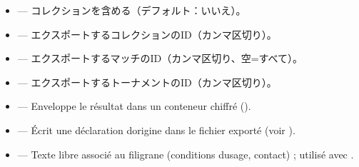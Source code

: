 \documentclass[letterpaper,10pt,dvipdfmx]{sphinxmanual}
\begin{document}
\begin{itemize}
\item {} 
\sphinxAtStartPar
{} — コレクションを含める（デフォルト：いいえ）。

\item {} 
\sphinxAtStartPar
{} — エクスポートするコレクションのID（カンマ区切り）。

\item {} 
\sphinxAtStartPar
{} — エクスポートするマッチのID（カンマ区切り、空=すべて）。

\item {} 
\sphinxAtStartPar
{} — エクスポートするトーナメントのID（カンマ区切り）。

\item {} 
\sphinxAtStartPar
{} — Enveloppe le résultat dans un conteneur chiffré ().

\item {} 
\sphinxAtStartPar
{} — Écrit une déclaration d\textquotesingle{}origine  dans le fichier
exporté (voir {\hyperref[\detokenize{manuel:diffusion-controlee}]{}}).

\item {} 
\sphinxAtStartPar
{} — Texte libre associé au filigrane (conditions
d\textquotesingle{}usage, contact) ; utilisé avec .

\end{itemize}

\sphinxAtStartPar
{}
\end{document}
